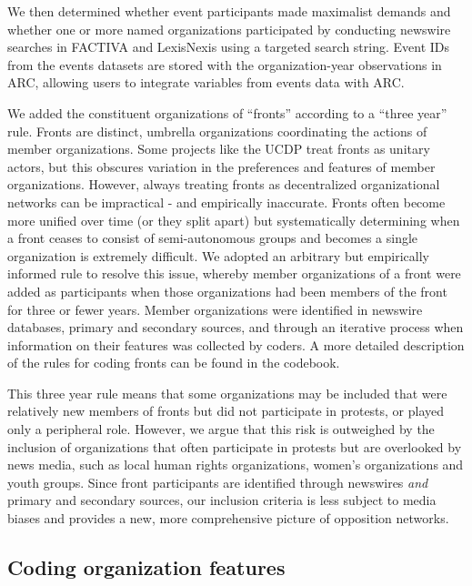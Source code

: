 We then determined whether event participants made maximalist demands and
whether one or more named organizations participated by conducting newswire
searches in FACTIVA and LexisNexis using a targeted search string. Event IDs
from the events datasets are stored with the organization-year observations in
ARC, allowing users to integrate variables from events data with ARC. 

We added the constituent organizations of ``fronts'' according to a ``three
year'' rule. Fronts are distinct, umbrella organizations coordinating the
actions of member organizations. Some projects like the UCDP treat fronts as
unitary actors, but this obscures variation in the preferences and features of
member organizations. However, always treating fronts as decentralized
organizational networks can be impractical - and empirically inaccurate. Fronts
often become more unified over time (or they split apart) but systematically
determining when a front ceases to consist of semi-autonomous groups and becomes
a single organization is extremely difficult. We adopted an arbitrary but
empirically informed rule to resolve this issue, whereby member organizations of
a front were added as participants when those organizations had been members of
the front for three or fewer years. Member organizations were identified in
newswire databases, primary and secondary sources, and through an iterative
process when information on their features was collected by coders.  A more
detailed description of the rules for coding fronts can be found in the
codebook. 

This three year rule means that some organizations may be included that were
relatively new members of fronts but did not participate in protests, or played
only a peripheral role. However, we argue that this risk is outweighed by the
inclusion of organizations that often participate in protests but are overlooked
by news media, such as local human rights organizations, women's organizations
and youth groups. Since front participants are identified through newswires
\textit{and} primary and secondary sources, our inclusion criteria is less
subject to media biases and provides a new, more comprehensive picture of
opposition networks.


\subsection{Coding organization features}

